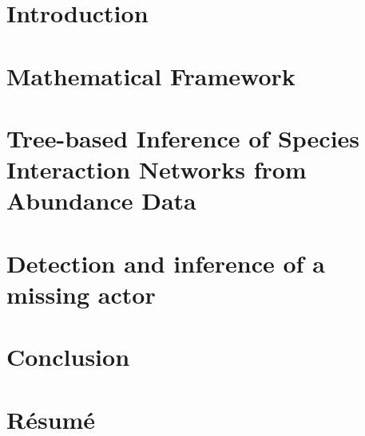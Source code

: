 


 


\setcounter{chapter}{-1}

\frontmatter

\setcounter{tocdepth}{1}
\tableofcontents 
 \mainmatter

 

\chapter{Introduction}

 \clearemptydoublepage
\ActivateBG 
\chapter{Mathematical Framework}

 
\chapter{Tree-based Inference of Species Interaction Networks from Abundance Data}

 
\chapter{Detection and inference of a missing actor}


\clearemptydoublepage
 
\chapter{Conclusion}



 \clearemptydoublepage
\DeactivateBG 
\chapter{Résumé}
  



